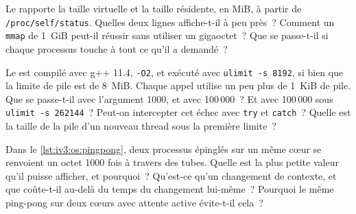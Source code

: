 \begin{question}\label{iq:iv3:operating-systems-concurrency-and-networks:12}
Le  rapporte la taille virtuelle et la taille résidente, en MiB, à partir de \texttt{/proc/self/status}. Quelles deux lignes affiche-t-il à peu près~? Comment un \texttt{mmap} de 1~GiB peut-il réussir sans utiliser un gigaoctet~? Que se passe-t-il si chaque processus touche à tout ce qu'il a demandé~?
\label{lst:iv3:os:rssvsz}
\end{question}

\begin{question}\label{iq:iv3:operating-systems-concurrency-and-networks:13}
Le  est compilé avec g++ 11.4, \texttt{-O2}, et exécuté avec \texttt{ulimit -s 8192}, si bien que la limite de pile est de 8~MiB. Chaque appel utilise un peu plus de 1~KiB de pile. Que se passe-t-il avec l'argument 1000, et avec 100\,000~? Et avec 100\,000 sous \texttt{ulimit -s 262144}~? Peut-on intercepter cet échec avec \texttt{try} et \texttt{catch}~? Quelle est la taille de la pile d'un nouveau thread sous la première limite~?
\label{lst:iv3:os:stackdepth}
\end{question}

\begin{question}\label{iq:iv3:operating-systems-concurrency-and-networks:14}
Dans le \cref{lst:iv3:os:pingpong}, deux processus épinglés sur un même cœur se renvoient un octet 1000 fois à travers des tubes. Quelle est la plus petite valeur qu'il puisse afficher, et pourquoi~? Qu'est-ce qu'un changement de contexte, et que coûte-t-il au-delà du temps du changement lui-même~? Pourquoi le même ping-pong sur deux cœurs avec attente active évite-t-il cela~?
\label{lst:iv3:os:pingpong}
\end{question}

